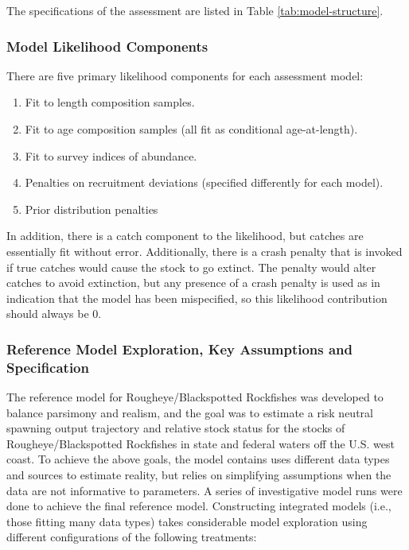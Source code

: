 \documentclass[
]{scrartcl}
\providecommand{\tightlist}{%
  \setlength{\itemsep}{0pt}\setlength{\parskip}{0pt}}\usepackage{longtable,booktabs,array}
\begin{document}
The specifications of the assessment are listed in Table
\ref{tab:model-structure}.

\subsubsection{Model Likelihood
Components}\label{model-likelihood-components}

There are five primary likelihood components for each assessment model:

\begin{enumerate}
\def\labelenumi{\arabic{enumi}.}
\tightlist
\item
  Fit to length composition samples.
\item
  Fit to age composition samples (all fit as conditional age-at-length).
\item
  Fit to survey indices of abundance.
\item
  Penalties on recruitment deviations (specified differently for each
  model).
\item
  Prior distribution penalties
\end{enumerate}

In addition, there is a catch component to the likelihood, but catches
are essentially fit without error. Additionally, there is a crash
penalty that is invoked if true catches would cause the stock to go
extinct. The penalty would alter catches to avoid extinction, but any
presence of a crash penalty is used as in indication that the model has
been mispecified, so this likelihood contribution should always be 0.

\subsubsection{Reference Model Exploration, Key Assumptions and
Specification}\label{reference-model-exploration-key-assumptions-and-specification}

The reference model for Rougheye/Blackspotted Rockfishes was developed
to balance parsimony and realism, and the goal was to estimate a risk
neutral spawning output trajectory and relative stock status for the
stocks of Rougheye/Blackspotted Rockfishes in state and federal waters
off the U.S. west coast. To achieve the above goals, the model contains
uses different data types and sources to estimate reality, but relies on
simplifying assumptions when the data are not informative to parameters.
A series of investigative model runs were done to achieve the final
reference model. Constructing integrated models (i.e., those fitting
many data types) takes considerable model exploration using different
configurations of the following treatments:
\end{document}

